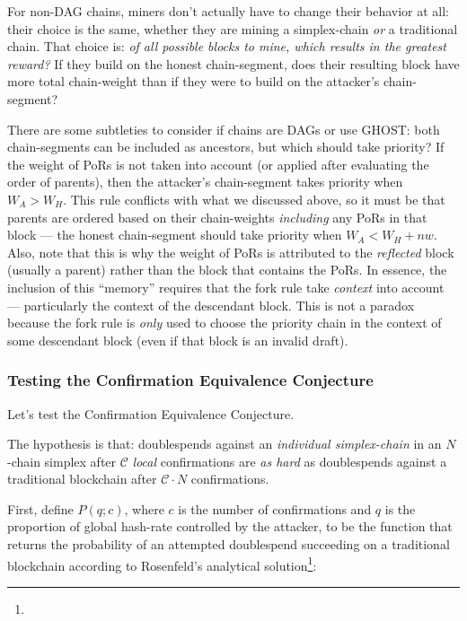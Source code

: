 For non-DAG chains, miners don't actually have to change their behavior at all: their choice is the same, whether they are mining a simplex-chain \emph{or} a traditional chain.
That choice is: \emph{of all possible blocks to mine, which results in the greatest reward?}
If they build on the honest chain-segment, does their resulting block have more total chain-weight than if they were to build on the attacker's chain-segment?

There are some subtleties to consider if chains are DAGs or use GHOST: both chain-segments can be included as ancestors, but which should take priority?
If the weight of PoRs is not taken into account (or applied after evaluating the order of parents), then the attacker's chain-segment takes priority when $W_A > W_H$.
This rule conflicts with what we discussed above, so it must be that parents are ordered based on their chain-weights \emph{including} any PoRs in that block --- the honest chain-segment should take priority when $W_A < W_H + nw$.
Also, note that this is why the weight of PoRs is attributed to the \emph{reflected} block (usually a parent) rather than the block that contains the PoRs.
In essence, the inclusion of this ``memory'' requires that the fork rule take \emph{context} into account --- particularly the context of the descendant block.
This is not a paradox because the fork rule is \emph{only} used to choose the priority chain in the context of some descendant block (even if that block is an invalid draft).




\subsubsection{Testing the Confirmation Equivalence Conjecture}

\label{sec:por-simulation-experiment}

Let's test the Confirmation Equivalence Conjecture.


The hypothesis is that: doublespends against an \emph{individual simplex-chain} in an $N$-chain simplex after $\mathcal{C}$ \emph{local} confirmations are \emph{as hard} as doublespends against a traditional blockchain after $\mathcal{C}\cdot N$ confirmations.

First, define $P(q; c)$, where $c$ is the number of confirmations and $q$ is the proportion of global hash-rate controlled by the attacker, to be the function that returns the probability of an attempted doublespend succeeding on a traditional blockchain according to Rosenfeld's analytical solution\footnote{
  \citeAHBDS{}
}:

